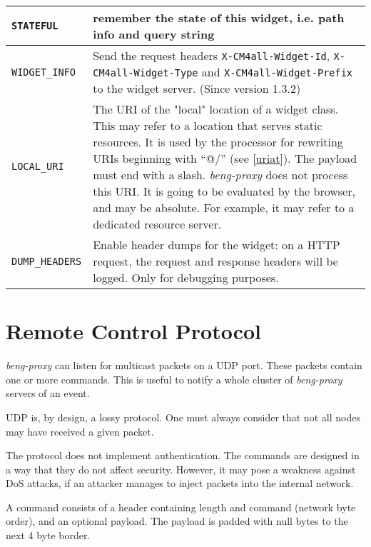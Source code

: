 \documentclass[a4paper,12pt]{article}
\begin{document}
\begin{longtable}{|l|p{8cm}|}
\hline

\verb|STATEFUL| & remember the state of this widget, i.e. path info
and query string \\

\hline

\verb|WIDGET_INFO| & Send the request headers
\verb|X-CM4all-Widget-Id|, \verb|X-CM4all-Widget-Type| and
\verb|X-CM4all-Widget-Prefix| to the widget server.
\scriptsize{(Since version 1.3.2)}\\

\hline

\label{localuri}
\verb|LOCAL_URI| & The URI of the "local" location of a widget class.
This may refer to a location that serves static resources.  It is used
by the processor for rewriting URIs beginning with ``@/'' (see
\ref{uriat}).  The payload must end with a slash.  \emph{beng-proxy}
does not process this URI.  It is going to be evaluated by the
browser, and may be absolute.  For example, it may refer to a
dedicated resource server. \\

\hline

\verb|DUMP_HEADERS| & Enable header dumps for the widget: on a HTTP
request, the request and response headers will be logged.  Only for
debugging purposes. \\

\hline
\end{longtable}


\section{Remote Control Protocol}

\emph{beng-proxy} can listen for multicast packets on a UDP port.
These packets contain one or more commands.  This is useful to notify
a whole cluster of \emph{beng-proxy} servers of an event.

UDP is, by design, a lossy protocol.  One must always consider that
not all nodes may have received a given packet.

The protocol does not implement authentication.  The commands are
designed in a way that they do not affect security.  However, it may
pose a weakness against DoS attacks, if an attacker manages to inject
packets into the internal network.

A command consists of a header containing length and command (network
byte order), and an optional payload.  The payload is padded with null
bytes to the next 4 byte border.
\end{document}

